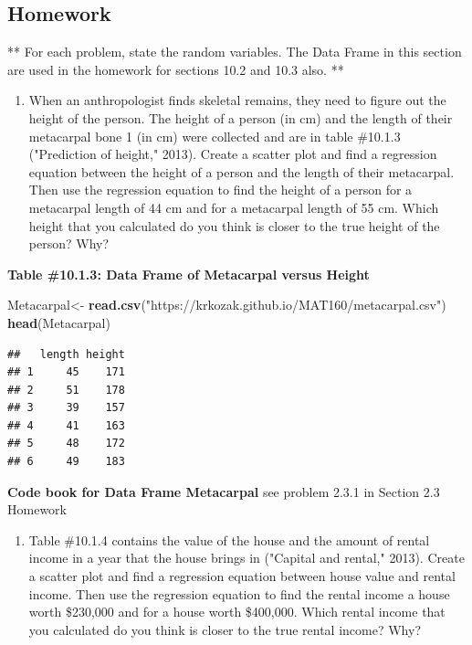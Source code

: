 \documentclass[
]{book}
\newenvironment{Shaded}{\begin{snugshade}}{\end{snugshade}}
\newcommand{\KeywordTok}[1]{\textcolor[rgb]{0.13,0.29,0.53}{\textbf{#1}}}
\newcommand{\NormalTok}[1]{#1}
\newcommand{\StringTok}[1]{\textcolor[rgb]{0.31,0.60,0.02}{#1}}
\providecommand{\tightlist}{%
  \setlength{\itemsep}{0pt}\setlength{\parskip}{0pt}}
\begin{document}
\hypertarget{homework-25}{%
\subsection{Homework}\label{homework-25}}

** For each problem, state the random variables. The Data Frame in this section are used
in the homework for sections 10.2 and 10.3 also. **

\begin{enumerate}
\def\labelenumi{\arabic{enumi}.}
\tightlist
\item
  When an anthropologist finds skeletal remains, they need to figure out the height of the person. The height of a person (in cm) and the length of their metacarpal bone 1 (in cm) were collected and are in table \#10.1.3 ("Prediction of height," 2013). Create a scatter plot and find a regression equation between the height of a person and the length of their metacarpal. Then use the regression equation to find the height of a person for a metacarpal length of 44 cm and for a metacarpal length of 55 cm. Which height that you calculated do you think is closer to the true height of the person? Why?
\end{enumerate}

\textbf{Table \#10.1.3: Data Frame of Metacarpal versus Height}

\begin{Shaded}
\begin{Highlighting}[]
\NormalTok{Metacarpal<-}\StringTok{ }\KeywordTok{read.csv}\NormalTok{(}\StringTok{"https://krkozak.github.io/MAT160/metacarpal.csv"}\NormalTok{)}
\KeywordTok{head}\NormalTok{(Metacarpal)}
\end{Highlighting}
\end{Shaded}

\begin{verbatim}
##   length height
## 1     45    171
## 2     51    178
## 3     39    157
## 4     41    163
## 5     48    172
## 6     49    183
\end{verbatim}

\textbf{Code book for Data Frame Metacarpal} see problem 2.3.1 in Section 2.3 Homework

\begin{enumerate}
\def\labelenumi{\arabic{enumi}.}
\setcounter{enumi}{1}
\tightlist
\item
  Table \#10.1.4 contains the value of the house and the amount of rental income in a year that the house brings in ("Capital and rental," 2013). Create a scatter plot and find a regression equation between house value and rental income. Then use the regression equation to find the rental income a house worth \$230,000 and for a house worth \$400,000. Which rental income that you calculated do you think is closer to the true rental income? Why?
\end{enumerate}
\end{document}
